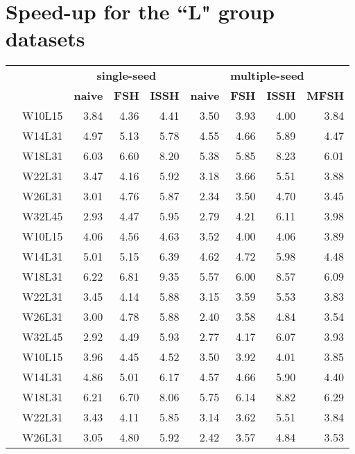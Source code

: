 \section{Speed-up for the “L" group datasets}
\begin{table}[!ht]
	\raggedleft
	\begin{tabular}{c r | rrr | rrrr}
		& & \multicolumn{3}{|c}{\textbf{single-seed}} & \multicolumn{4}{|c}{\textbf{multiple-seed}} \\
		& & \textbf{naive} & \textbf{FSH} & \textbf{ISSH} & \textbf{naive} & \textbf{FSH} & \textbf{ISSH} & \textbf{MFSH} \\
		\toprule
		\multirow{6}{*}{\rotatebox[origin=c]{90}{\textbf{L500000}}}
		& W10L15 & 3.84 & 4.36 & 4.41 & 3.50 & 3.93 & 4.00 & 3.84 \\
		& W14L31 & 4.97 & 5.13 & 5.78 & 4.55 & 4.66 & 5.89 & 4.47 \\
		& W18L31 & 6.03 & 6.60 & 8.20 & 5.38 & 5.85 & 8.23 & 6.01 \\
		& W22L31 & 3.47 & 4.16 & 5.92 & 3.18 & 3.66 & 5.51 & 3.88 \\
		& W26L31 & 3.01 & 4.76 & 5.87 & 2.34 & 3.50 & 4.70 & 3.45 \\
		& W32L45 & 2.93 & 4.47 & 5.95 & 2.79 & 4.21 & 6.11 & 3.98 \\
		\midrule
		\multirow{6}{*}{\rotatebox[origin=c]{90}{\textbf{L1000000}}}
		& W10L15 & 4.06 & 4.56 & 4.63 & 3.52 & 4.00 & 4.06 & 3.89 \\
		& W14L31 & 5.01 & 5.15 & 6.39 & 4.62 & 4.72 & 5.98 & 4.48 \\
		& W18L31 & 6.22 & 6.81 & 9.35 & 5.57 & 6.00 & 8.57 & 6.09 \\
		& W22L31 & 3.45 & 4.14 & 5.88 & 3.15 & 3.59 & 5.53 & 3.83 \\
		& W26L31 & 3.00 & 4.78 & 5.88 & 2.40 & 3.58 & 4.84 & 3.54 \\
		& W32L45 & 2.92 & 4.49 & 5.93 & 2.77 & 4.17 & 6.07 & 3.93 \\
		\midrule
		\multirow{6}{*}{\rotatebox[origin=c]{90}{\textbf{L1500000}}}
		& W10L15 & 3.96 & 4.45 & 4.52 & 3.50 & 3.92 & 4.01 & 3.85 \\
		& W14L31 & 4.86 & 5.01 & 6.17 & 4.57 & 4.66 & 5.90 & 4.40 \\
		& W18L31 & 6.21 & 6.70 & 8.06 & 5.75 & 6.14 & 8.82 & 6.29 \\
		& W22L31 & 3.43 & 4.11 & 5.85 & 3.14 & 3.62 & 5.51 & 3.84 \\
		& W26L31 & 3.05 & 4.80 & 5.92 & 2.42 & 3.57 & 4.84 & 3.53 \\

\end{tabular}
\end{table}
